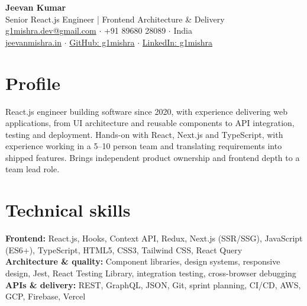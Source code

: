 \documentclass[a4paper,10pt]{article}
\begin{document}
\begin{center}
{\LARGE\textbf{Jeevan Kumar}}\\[3pt]
Senior React.js Engineer | Frontend Architecture \& Delivery\\[3pt]
\href{mailto:g1mishra.dev@gmail.com}{g1mishra.dev@gmail.com} $\cdot$ +91 89680 28089 $\cdot$ India\\[2pt]
\href{https://jeevanmishra.in}{jeevanmishra.in} $\cdot$ \href{https://github.com/g1mishra}{GitHub: g1mishra} $\cdot$ \href{https://linkedin.com/in/g1mishra}{LinkedIn: g1mishra}
\end{center}
\section{Profile}
React.js engineer building software since 2020, with experience delivering web applications, from UI architecture and reusable components to API integration, testing and deployment. Hands-on with React, Next.js and TypeScript, with experience working in a 5--10 person team and translating requirements into shipped features. Brings independent product ownership and frontend depth to a team lead role.
\section{Technical skills}
\textbf{Frontend:} React.js, Hooks, Context API, Redux, Next.js (SSR/SSG), JavaScript (ES6+), TypeScript, HTML5, CSS3, Tailwind CSS, React Query\\ \textbf{Architecture \& quality:} Component libraries, design systems, responsive design, Jest, React Testing Library, integration testing, cross-browser debugging\\ \textbf{APIs \& delivery:} REST, GraphQL, JSON, Git, sprint planning, CI/CD, AWS, GCP, Firebase, Vercel
\end{document}
